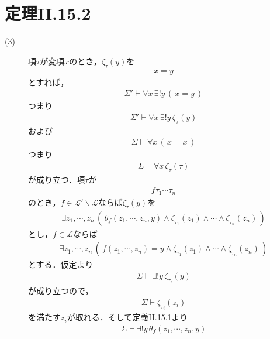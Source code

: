 \documentclass[a4j,10.5pt,oneside,openany]{jsbook}
\theoremstyle{mystyle}
\begin{document}
\section{定理I\hspace{-.1em}I.15.2}
	\begin{description}
		\item[(3)]
			項$\tau$が変項$x$のとき，$\zeta_{\tau}(y)$を
			\begin{align}
				x = y
			\end{align}
			とすれば，
			\begin{align}
				\Sigma' \vdash \forall x\, \exists! y\, (\, x=y\, )
			\end{align}
			つまり
			\begin{align}
				\Sigma' \vdash \forall x\, \exists! y\, \zeta_{\tau}(y)
			\end{align}
			および
			\begin{align}
				\Sigma \vdash \forall x\, (\, x=x\, )
			\end{align}
			つまり
			\begin{align}
				\Sigma \vdash \forall x\, \zeta_{\tau}(\tau)
			\end{align}
			が成り立つ．項$\tau$が
			\begin{align}
				f\tau_{1}\cdots\tau_{n}
			\end{align}
			のとき，$f \in \mathcal{L}' \backslash \mathcal{L}$ならば$\zeta_{\tau}(y)$を
			\begin{align}
				\exists z_{1}, \cdots, z_{n}\, \left(\, 
				\theta_{f}(z_{1},\cdots,z_{n},y) \wedge \zeta_{\tau_{1}}(z_{1}) \wedge
				\cdots \wedge \zeta_{\tau_{n}}(z_{n})\, \right)
			\end{align}
			とし，$f \in \mathcal{L}$ならば
			\begin{align}
				\exists z_{1}, \cdots, z_{n}\, \left(\, 
				f(z_{1},\cdots,z_{n}) = y \wedge \zeta_{\tau_{1}}(z_{1}) \wedge
				\cdots \wedge \zeta_{\tau_{n}}(z_{n})\, \right)
			\end{align}
			とする．仮定より
			\begin{align}
				\Sigma \vdash \exists! y\, \zeta_{\tau_{i}}(y)
			\end{align}
			が成り立つので，
			\begin{align}
				\Sigma \vdash \zeta_{\tau_{i}}(z_{i})
			\end{align}
			を満たす$z_{i}$が取れる．そして定義I\hspace{-.1em}I.15.1より
			\begin{align}
				\Sigma \vdash \exists!y\, \theta_{f}(z_{1},\cdots,z_{n},y)

\end{align}
\end{description}
\end{document}
